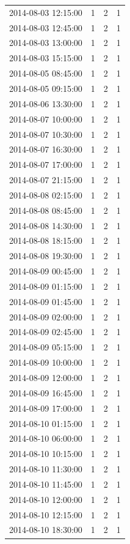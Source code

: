 \begin{tabular}{lrrr}
2014-08-03 12:15:00 & 1 & 2 & 1 \\
2014-08-03 12:45:00 & 1 & 2 & 1 \\
2014-08-03 13:00:00 & 1 & 2 & 1 \\
2014-08-03 15:15:00 & 1 & 2 & 1 \\
2014-08-05 08:45:00 & 1 & 2 & 1 \\
2014-08-05 09:15:00 & 1 & 2 & 1 \\
2014-08-06 13:30:00 & 1 & 2 & 1 \\
2014-08-07 10:00:00 & 1 & 2 & 1 \\
2014-08-07 10:30:00 & 1 & 2 & 1 \\
2014-08-07 16:30:00 & 1 & 2 & 1 \\
2014-08-07 17:00:00 & 1 & 2 & 1 \\
2014-08-07 21:15:00 & 1 & 2 & 1 \\
2014-08-08 02:15:00 & 1 & 2 & 1 \\
2014-08-08 08:45:00 & 1 & 2 & 1 \\
2014-08-08 14:30:00 & 1 & 2 & 1 \\
2014-08-08 18:15:00 & 1 & 2 & 1 \\
2014-08-08 19:30:00 & 1 & 2 & 1 \\
2014-08-09 00:45:00 & 1 & 2 & 1 \\
2014-08-09 01:15:00 & 1 & 2 & 1 \\
2014-08-09 01:45:00 & 1 & 2 & 1 \\
2014-08-09 02:00:00 & 1 & 2 & 1 \\
2014-08-09 02:45:00 & 1 & 2 & 1 \\
2014-08-09 05:15:00 & 1 & 2 & 1 \\
2014-08-09 10:00:00 & 1 & 2 & 1 \\
2014-08-09 12:00:00 & 1 & 2 & 1 \\
2014-08-09 16:45:00 & 1 & 2 & 1 \\
2014-08-09 17:00:00 & 1 & 2 & 1 \\
2014-08-10 01:15:00 & 1 & 2 & 1 \\
2014-08-10 06:00:00 & 1 & 2 & 1 \\
2014-08-10 10:15:00 & 1 & 2 & 1 \\
2014-08-10 11:30:00 & 1 & 2 & 1 \\
2014-08-10 11:45:00 & 1 & 2 & 1 \\
2014-08-10 12:00:00 & 1 & 2 & 1 \\
2014-08-10 12:15:00 & 1 & 2 & 1 \\
2014-08-10 18:30:00 & 1 & 2 & 1 \\

\end{tabular}
